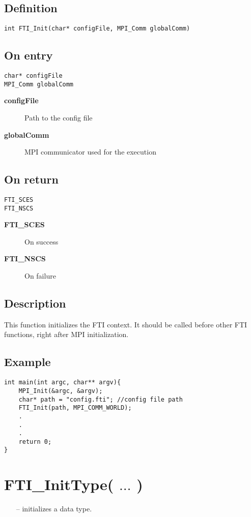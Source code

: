 \documentclass{refrep}
\begin{document}
\subsection*{Definition}
\begin{lstlisting}[frame=single]
int FTI_Init(char* configFile, MPI_Comm globalComm)
\end{lstlisting}
\subsection*{On entry}
\begin{lstlisting}[frame=single]
char* configFile
MPI_Comm globalComm
\end{lstlisting}
\begin{description}
\item[\textbf{configFile}] Path to the config file
\item[\textbf{globalComm}] MPI communicator used for the execution
\end{description}
\subsection*{On return}
\begin{lstlisting}[frame=single]
FTI_SCES
FTI_NSCS
\end{lstlisting}
\begin{description}
\item[\textbf{FTI\_SCES}] On success
\item[\textbf{FTI\_NSCS}] On failure
\end{description}
\subsection*{Description}
This function initializes the FTI context. It should be called before other FTI functions, right after MPI initialization.
\subsection*{Example}
\begin{center}
\begin{lstlisting}[frame=single]
int main(int argc, char** argv){
    MPI_Init(&argc, &argv);
    char* path = "config.fti"; //config file path
    FTI_Init(path, MPI_COMM_WORLD);
    .
    .
    .
    return 0;
}
\end{lstlisting}
\end{center}
\newpage
\section{\asciifamily FTI\_InitType( $\dots$ )}\label{sec:ftiinittype}
\begin{framed}
\begin{itemize}
\item[--] initializes a data type.
\end{itemize}
\end{framed}
\end{document}
